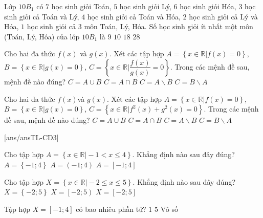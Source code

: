 \begin{ex}
	Lớp $10B_1$ có $7$ học sinh giỏi Toán, $5$ học sinh giỏi Lý, $6$ học sinh giỏi Hóa, $3$ học sinh giỏi cả Toán và Lý, $4$ học sinh giỏi cả Toán và Hóa, $2$ học sinh giỏi cả Lý và Hóa, $1$ học sinh giỏi cả $3$ môn Toán, Lý, Hóa. Số học sinh giỏi ít nhất một môn (Toán, Lý, Hóa) của lớp $10B_1$ là
	\choice
	{$9 $}
	{\True $10 $}
	{$18 $}
	{$28 $}
	\loigiai{}
\end{ex}

\begin{ex}
	Cho hai đa thức $f(x)$ và $g(x)$. Xét các tập hợp $A=\left\{x\in \mathbb{R}|f(x)=0\right\}$, $B=\left\{x\in \mathbb{R}|g(x)=0\right\}$, $C=\left\{x\in \mathbb{R}|\dfrac{f(x)}{g(x)}=0\right\}$. Trong các mệnh đề sau, mệnh đề nào đúng?
	\choice
	{$C=A\cup B$}
	{$C=A\cap B$}
	{\True $C=A\backslash B$}
	{$C=B\backslash A$}
\end{ex}

\begin{ex}
	Cho hai đa thức $f(x)$và $g(x)$. Xét các tập hợp $A=\left\{x\in \mathbb{R}|f(x)=0\right\}$, $B=\left\{x\in \mathbb{R}|g(x)=0\right\}$, $C=\left\{x\in \mathbb{R}|f^2(x) + g^2(x)=0\right\}$. Trong các mệnh đề sau, mệnh đề nào đúng?
	\choice
	{$C=A\cup B$}
	{\True $C=A\cap B$}
	{$C=A\backslash B$}
	{$C=B\backslash A$}
\end{ex}


[ans/ansTL-CD3]
\setcounter{ex}{0}

\begin{ex}%
	Cho tập hợp $A = \left\{x \in \mathbb{R}\big|- 1< x \le 4\right\}$. Khẳng định nào sau đây đúng?
	\choice{\True $A = \left(-1;4\right]$}
	{$A = \left\{-1;4\right\}$}
	{$A = \left(-1;4\right)$}
	{$A = \left[-1;4\right]$}
	\loigiai{
	}
\end{ex}
\begin{ex}%
	Cho tập hợp $X = \left\{x \in \mathbb{R}\big|- 2\le x \le 5\right\}$. Khẳng định nào sau đây đúng?
	{$X = \left\{-2;5\right\}$}
	{$X = \left[-2;5\right)$}
	{\True $X = \left[-2;5\right]$}
	\loigiai{
	}
\end{ex}
\begin{ex}%
	Tập hợp $X = \left[-1;4\right]$ có bao nhiêu phần tử?
	{$1$}
	{$5$}
	{\True Vô số}
	\loigiai{
	}
\end{ex}

